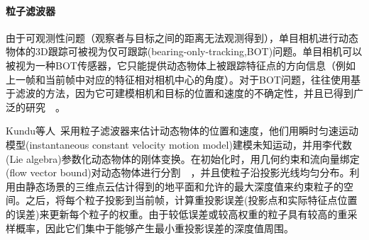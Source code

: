 \paragraph{粒子滤波器}
由于可观测性问题（观察者与目标之间的距离无法观测得到），单目相机进行动态物体的3D跟踪可被视为仅可跟踪(bearing-only-tracking,BOT)问题。单目相机可以被视为一种BOT传感器，它只能提供动态物体上被跟踪特征点的方向信息（例如上一帧和当前帧中对应的特征相对相机中心的角度）。对于BOT问题，往往使用基于滤波的方法，因为它可建模相机和目标的位置和速度的不确定性，并且已得到广泛的研究~\cite{aidala1983utilization}~\cite{le1998bearings}。

Kundu等人~\cite{kundu2011realtime}采用粒子滤波器来估计动态物体的位置和速度，他们用瞬时匀速运动模型(instantaneous constant velocity motion model)建模未知运动，并用李代数(Lie algebra)参数化动态物体的刚体变换。在初始化时，用几何约束和流向量绑定(flow vector bound)对动态物体进行分割~\cite{kundu2009movingA}~\cite{kundu2010realtime}，并且使粒子沿投影光线均匀分布。利用由静态场景的三维点云估计得到的地平面和允许的最大深度值来约束粒子的空间。之后，将每个粒子投影到当前帧，计算重投影误差(投影点和实际特征点位置的误差)来更新每个粒子的权重。由于较低误差或较高权重的粒子具有较高的重采样概率，因此它们集中于能够产生最小重投影误差的深度值周围。



